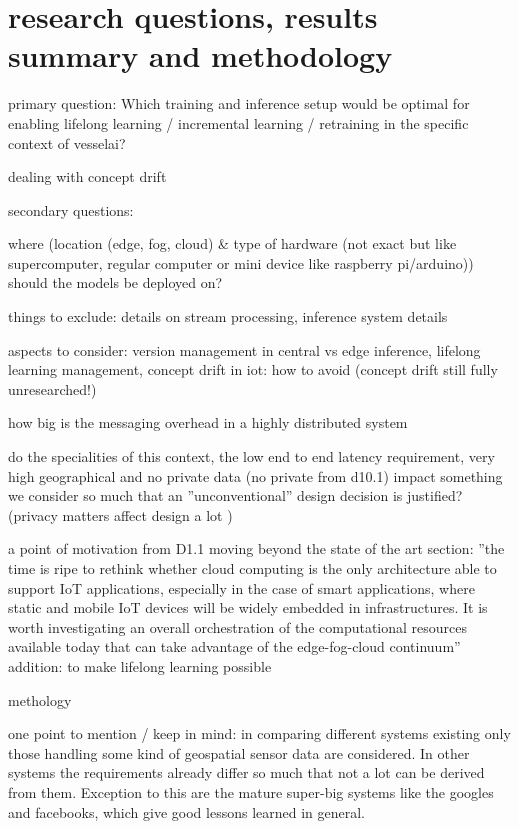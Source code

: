 \section{research questions, results summary and methodology}

primary question: Which training and inference setup would be optimal for enabling lifelong learning / incremental learning / retraining in the specific context of vesselai?

dealing with concept drift

secondary questions:

where (location (edge, fog, cloud) & type of hardware (not exact but like supercomputer, regular computer or mini device like raspberry pi/arduino)) should the models be deployed on?

things to exclude: details on stream processing, inference system details

aspects to consider: version management in central vs edge inference, lifelong learning management, concept drift in iot: how to avoid (concept drift still fully unresearched!)

how big is the messaging overhead in a highly distributed system

do the specialities of this context, the low end to end latency requirement, very high geographical and no private data (no private from d10.1) impact something we consider so much that an ''unconventional'' design decision is justified? (privacy matters affect design a lot \cite{iotsystems})

a point of motivation from D1.1 moving beyond the state of the art section: ''the time is ripe  to  rethink  whether  cloud  computing  is  the  only  architecture  able  to  support  IoT  applications, especially  in  the  case  of  smart applications,  where  static  and  mobile  IoT  devices  will  be  widely embedded  in  infrastructures.  It  is  worth  investigating  an  overall  orchestration  of  the  computational resources  available  today  that  can  take  advantage  of  the  edge-fog-cloud  continuum'' addition: to make lifelong learning possible

methology

one point to mention / keep in mind: in comparing different systems existing only those handling some kind of geospatial sensor data are considered. In other systems the requirements already differ so much that not a lot can be derived from them. Exception to this are the mature super-big systems like the googles and facebooks, which give good lessons learned in general.


